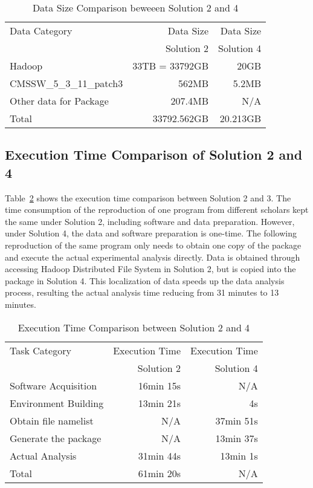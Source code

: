 \documentclass{acm_proc_article-sp}
\begin{document}
\begin{table}
    \centering
    \begin{tabular}{|l|r|r|}
    \hline
     Data Category & Data Size & Data Size \\
    & Solution 2 & Solution 4\\ \hline
    Hadoop & 33TB = 33792GB & 20GB \\ \hline
     CMSSW\_5\_3\_11\_patch3 & 562MB & 5.2MB \\ \hline
     Other data for Package & 207.4MB & N/A \\ \hline
     Total & 33792.562GB & 20.213GB \\ \hline
    \end{tabular}
    \caption{Data Size Comparison beweeen Solution 2 and 4}
    \label{table:datasize-2nd3rd}
\end{table}

\subsection{Execution Time Comparison of Solution 2 and 4}

Table~\ref{table:time-2nd3rd} shows the execution time comparison between
Solution 2 and 3. The time consumption of the reproduction of one program from
different scholars kept the same under Solution 2, including software and data
preparation. However, under Solution 4, the data and software preparation is
one-time. The following reproduction of the same program only needs to obtain
one copy of the package and execute the actual experimental analysis directly.
Data is obtained through accessing Hadoop Distributed File System in Solution 2, but is copied into the package in Solution 4. This localization of data speeds up the data analysis process, resulting the actual analysis time reducing from 31 minutes to 13 minutes.

\begin{table}
    \centering
    \begin{tabular}{|l|r|r|}
    \hline
    Task Category & Execution Time & Execution Time \\
    & Solution 2 & Solution 4\\ \hline
    Software Acquisition & 16min 15s & N/A \\ \hline
    Environment Building & 13min 21s  & 4s \\ \hline
    Obtain file namelist & N/A & 37min 51s \\ \hline
    Generate the package & N/A & 13min 37s \\ \hline
    Actual Analysis & 31min 44s & 13min 1s \\ \hline
    Total & 61min 20s & N/A \\ \hline
    \end{tabular}
    \caption{Execution Time Comparison between Solution 2 and 4}
    \label{table:time-2nd3rd}
\end{table}    
\end{document}
